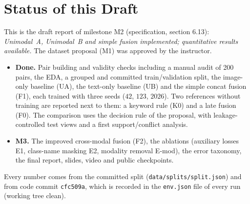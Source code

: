 \section*{Status of this Draft}

This is the draft report of milestone M2 (specification, section 6.13): \emph{Unimodal~A, Unimodal~B and
simple fusion implemented; quantitative results available.} The dataset proposal (M1) was approved by the
instructor.

\begin{itemize}
  \item \textbf{Done.} Pair building and validity checks including a manual audit of 200 pairs, the EDA, a grouped and committed train/validation split,
        the image-only baseline (UA), the text-only baseline (UB) and the simple concat fusion (F1), each trained
        with three seeds ($42$, $123$, $2026$). Two references without training are reported next to them:
        a keyword rule (K0) and a late fusion (F0). The comparison uses the decision rule of the proposal, with
        leakage-controlled test views and a first support/conflict analysis.
  \item \textbf{M3.} The improved cross-modal fusion (F2), the ablations (auxiliary losses E1, class-name masking E2,
        modality removal E-mod), the error taxonomy, the final report, slides, video and public checkpoints.
\end{itemize}

Every number comes from the committed split (\texttt{data/splits/split.json}) and from code commit
\texttt{cfc509a}, which is recorded in the \texttt{env.json} file of every run (working tree clean).
